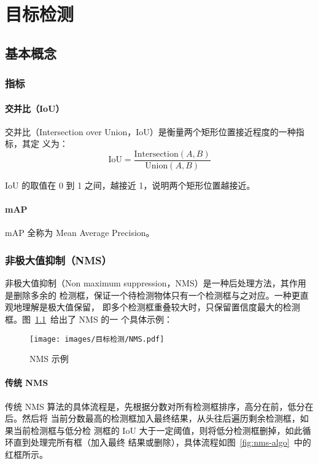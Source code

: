\part{目标检测}
\chapter{基本概念}

\section{指标}

\subsection{交并比（IoU）}
交并比（Intersection over Union，IoU）是衡量两个矩形位置接近程度的一种指标，其定
义为：
\begin{equation}
  \label{equ:IoU}
  \mathrm{IoU} = \frac{\mathrm{Intersection}(A, B)}{\mathrm{Union}(A, B)}
\end{equation}

IoU 的取值在 0 到 1 之间，越接近 1，说明两个矩形位置越接近。

\subsection{mAP}
mAP 全称为 Mean Average Precision。

\section{非极大值抑制（NMS）}

非极大值抑制（Non maximum suppression，NMS）是一种后处理方法，其作用是删除多余的
检测框，保证一个待检测物体只有一个检测框与之对应。一种更直观地理解是极大值保留，
即多个检测框重叠较大时，只保留置信度最大的检测框。图~\ref{fig:nms}~给出了 NMS 的一
个具体示例：

\begin{figure}[ht]
  \centering
  \texttt{[image: images/目标检测/NMS.pdf]}
  \caption{NMS 示例}\label{fig:nms}
\end{figure}

\subsection{传统 NMS}

传统 NMS 算法的具体流程是，先根据分数对所有检测框排序，高分在前，低分在后。然后将
当前分数最高的检测框加入最终结果，从头往后遍历剩余检测框，如果当前检测框与低分检
测框的 IoU 大于一定阈值，则将低分检测框删掉，如此循环直到处理完所有框（加入最终
结果或删除），具体流程如图~\ref{fig:nms-algo}~中的红框所示。

